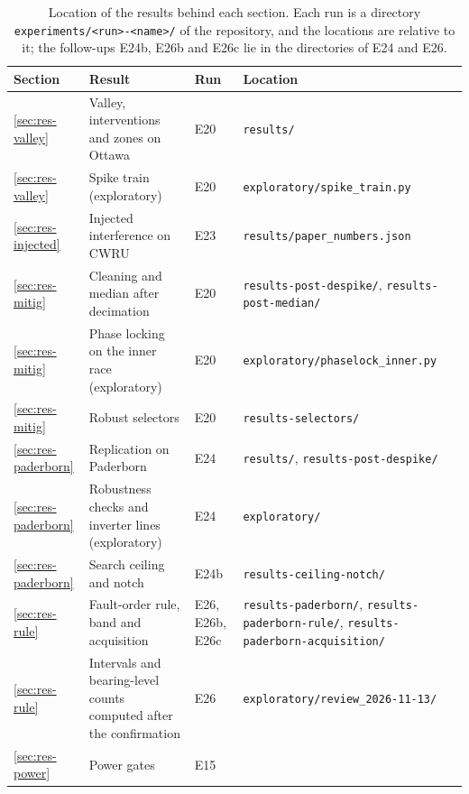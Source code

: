 \begin{table}[!htbp]
  \centering
  \caption{Location of the results behind each section. Each run is a directory
  \nolinkurl{experiments/<run>-<name>/} of the repository, and the locations are relative to it;
  the follow-ups E24b, E26b and E26c lie in the directories of E24 and E26.}
  \label{tab:locations}
  \footnotesize
  \begin{tabular}{@{}>{\raggedright\arraybackslash}p{}%
    >{\raggedright\arraybackslash}p{}%
    >{\raggedright\arraybackslash}p{}%
    >{\raggedright\arraybackslash}p{}@{}}
    \toprule
    Section & Result & Run & Location \\
    \midrule
    \ref{sec:res-valley} & Valley, interventions and zones on Ottawa & E20 & \nolinkurl{results/} \\
    \ref{sec:res-valley} & Spike train (exploratory) & E20 & \nolinkurl{exploratory/spike_train.py} \\
    \ref{sec:res-injected} & Injected interference on CWRU & E23 &
      \nolinkurl{results/paper_numbers.json} \\
    \ref{sec:res-mitig} & Cleaning and median after decimation & E20 &
      \nolinkurl{results-post-despike/}, \nolinkurl{results-post-median/} \\
    \ref{sec:res-mitig} & Phase locking on the inner race (exploratory) & E20 &
      \nolinkurl{exploratory/phaselock_inner.py} \\
    \ref{sec:res-mitig} & Robust selectors & E20 & \nolinkurl{results-selectors/} \\
    \ref{sec:res-paderborn} & Replication on Paderborn & E24 &
      \nolinkurl{results/}, \nolinkurl{results-post-despike/} \\
    \ref{sec:res-paderborn} & Robustness checks and inverter lines (exploratory) & E24 &
      \nolinkurl{exploratory/} \\
    \ref{sec:res-paderborn} & Search ceiling and notch & E24b & \nolinkurl{results-ceiling-notch/} \\
    \ref{sec:res-rule} & Fault-order rule, band and acquisition & E26, E26b, E26c &
      \nolinkurl{results-paderborn/}, \nolinkurl{results-paderborn-rule/},
      \nolinkurl{results-paderborn-acquisition/} \\
    \ref{sec:res-rule} & Intervals and bearing-level counts computed after the confirmation & E26 &
      \nolinkurl{exploratory/review_2026-11-13/} \\
    \ref{sec:res-power} & Power gates & E15 &

\end{tabular}
\end{table}
